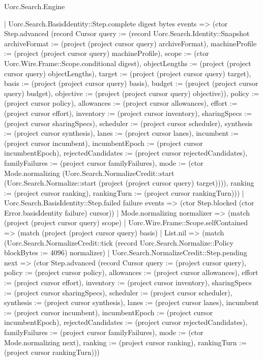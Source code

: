 \begin{lexlean}{Uorc.Search.Engine}
\begin{semanticmodule}
{      | Uorc.Search.BasisIdentity::Step.complete digest bytes events => (ctor Step.advanced (record Cursor {query := (record Uorc.Search.Identity::Snapshot {archiveFormat := (project (project cursor query) archiveFormat), machineProfile := (project (project cursor query) machineProfile), scope := (ctor Uorc.Wire.Frame::Scope.conditional digest), objectLengths := (project (project cursor query) objectLengths), target := (project (project cursor query) target), basis := (project (project cursor query) basis), budget := (project (project cursor query) budget), objective := (project (project cursor query) objective)}), policy := (project cursor policy), allowances := (project cursor allowances), effort := (project cursor effort), inventory := (project cursor inventory), sharingSpecs := (project cursor sharingSpecs), scheduler := (project cursor scheduler), synthesis := (project cursor synthesis), lanes := (project cursor lanes), incumbent := (project cursor incumbent), incumbentEpoch := (project cursor incumbentEpoch), rejectedCandidates := (project cursor rejectedCandidates), familyFailures := (project cursor familyFailures), mode := (ctor Mode.normalizing (Uorc.Search.NormalizeCredit::start (Uorc.Search.Normalize::start (project (project cursor query) target)))), ranking := (project cursor ranking), rankingTurn := (project cursor rankingTurn)}))
      | Uorc.Search.BasisIdentity::Step.failed failure events => (ctor Step.blocked (ctor Error.basisIdentity failure) cursor))
    | Mode.normalizing normalizer => (match (project (project cursor query) scope)
      | Uorc.Wire.Frame::Scope.selfContained => (match (project (project cursor query) basis)
        | List.nil => (match (Uorc.Search.NormalizeCredit::tick (record Uorc.Search.Normalize::Policy {blockBytes := 4096}) normalizer)
          | Uorc.Search.NormalizeCredit::Step.pending next => (ctor Step.advanced (record Cursor {query := (project cursor query), policy := (project cursor policy), allowances := (project cursor allowances), effort := (project cursor effort), inventory := (project cursor inventory), sharingSpecs := (project cursor sharingSpecs), scheduler := (project cursor scheduler), synthesis := (project cursor synthesis), lanes := (project cursor lanes), incumbent := (project cursor incumbent), incumbentEpoch := (project cursor incumbentEpoch), rejectedCandidates := (project cursor rejectedCandidates), familyFailures := (project cursor familyFailures), mode := (ctor Mode.normalizing next), ranking := (project cursor ranking), rankingTurn := (project cursor rankingTurn)}))
}
\end{semanticmodule}
\end{lexlean}
